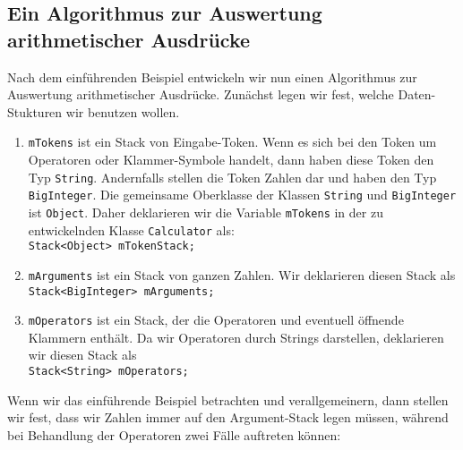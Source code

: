 \subsection{Ein Algorithmus zur Auswertung arithmetischer Ausdr\"ucke \label{algo-arith}}
Nach dem einf\"uhrenden Beispiel entwickeln wir nun einen Algorithmus zur Auswertung
arithmetischer Ausdr\"ucke.  Zun\"achst legen wir fest, welche Daten-Stukturen wir benutzen
wollen.
\begin{enumerate}
\item \texttt{mTokens} ist ein Stack von Eingabe-Token.  Wenn es sich bei den Token um Operatoren oder
      Klammer-Symbole handelt, dann haben diese Token den Typ \texttt{String}.
      Andernfalls stellen die Token Zahlen dar und haben den Typ \texttt{BigInteger}.
      Die gemeinsame Oberklasse der Klassen \texttt{String} und \texttt{BigInteger}
      ist \texttt{Object}.  Daher deklarieren wir die Variable \texttt{mTokens}
      in der zu entwickelnden Klasse \texttt{Calculator} als: \\[0.1cm]
      \hspace*{1.3cm} \texttt{Stack<Object> mTokenStack;}
\item \texttt{mArguments} ist ein Stack von ganzen Zahlen.  Wir deklarieren diesen Stack
      als \\[0.1cm]
      \hspace*{1.3cm} \texttt{Stack<BigInteger> mArguments;}
\item \texttt{mOperators} ist ein Stack, der die Operatoren und eventuell \"offnende
      Klammern enth\"alt.  Da wir Operatoren
      durch Strings darstellen, deklarieren wir diesen Stack als \\[0.1cm]
      \hspace*{1.3cm} \texttt{Stack<String> mOperators;}
\end{enumerate}
Wenn wir das einf\"uhrende Beispiel betrachten und verallgemeinern, dann stellen wir fest,
dass wir Zahlen immer auf 
den Argument-Stack legen m\"ussen, w\"ahrend bei Behandlung der Operatoren
zwei F\"alle auftreten k\"onnen:
